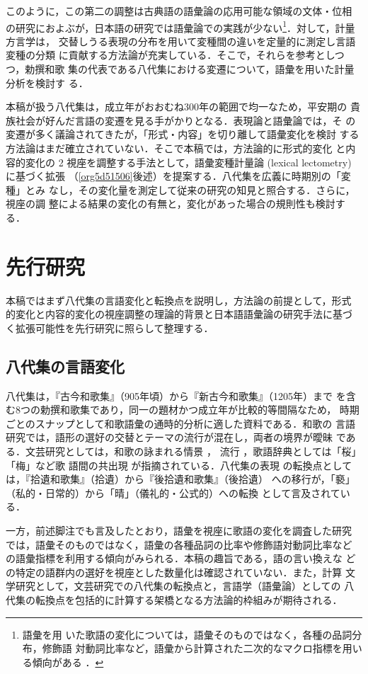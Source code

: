 \documentclass[submit]{ipsj}
\renewcommand{\ref}{\cref}
\begin{document}
このように，この第二の調整は古典語の語彙論の応用可能な領域の文体・位相
の研究におよぶが，日本語の研究では語彙論での実践が少ない\footnote{語彙を用
いた歌語の変化については，語彙そのものではなく，各種の品詞分布，修飾語
対動詞比率など，語彙から計算された二次的なマクロ指標を用いる傾向がある
\cite{nishihata1992Waka,hatano1941Waka}．}．対して，計量方言学は，
交替しうる表現の分布を用いて変種間の違いを定量的に測定し言語変種の分類
に貢献する方法論が充実している．そこで，それらを参考としつつ，勅撰和歌
集の代表である八代集における変遷について，語彙を用いた計量分析を検討す
る．

本稿が扱う八代集は，成立年がおおむね300年の範囲で均一なため，平安期の
貴族社会が好んだ言語の変遷を見る手がかりとなる．表現論と語彙論では，そ
の変遷が多く議論されてきたが，「形式・内容」を切り離して語彙変化を検討
する方法論はまだ確立されていない．そこで本稿では，方法論的に形式的変化
と内容的変化の 2 視座を調整する手法として，語彙変種計量論 (lexical
lectometry) \cite{Speelman2003Profilebased} に基づく拡張
（\ref{org5d51506}後述）を提案する．八代集を広義に時期別の「変種」とみ
なし，その変化量を測定して従来の研究の知見と照合する．さらに，視座の調
整による結果の変化の有無と，変化があった場合の規則性も検討する．
\section{先行研究\label{orgf70a416}}
\label{sec:orge82481f}
本稿ではまず八代集の言語変化と転換点を説明し，方法論の前提として，形式
的変化と内容的変化の視座調整の理論的背景と日本語語彙論の研究手法に基づ
く拡張可能性を先行研究に照らして整理する．
\subsection{八代集の言語変化\label{org031a584}}
\label{sec:org03b9170}
八代集は，『古今和歌集』（905年頃）から『新古今和歌集』（1205年）まで
を含む8つの勅撰和歌集であり，同一の題材かつ成立年が比較的等間隔なため，
時期ごとのスナップとして和歌語彙の通時的分析に適した資料である．和歌の
言語研究では，語形の選好の交替とテーマの流行が混在し，両者の境界が曖昧
である．文芸研究としては，和歌の詠まれる情景 \cite{ueno1976Koshui}，
流行 \cite{kawamura1991Sekkan}，歌語辞典としては「桜」「梅」など歌
語間の共出現 \cite{katagiri1983Uta} が指摘されている．八代集の表現
の転換点としては，『拾遺和歌集』（拾遺）から『後拾遺和歌集』（後拾遺）
への移行が，「褻」（私的・日常的）から「晴」（儀礼的・公式的）への転換
として言及されている\cite{ueno1976Koshui,kawamura1991Sekkan}．

一方，前述脚注でも言及したとおり，語彙を視座に歌語の変化を調査した研究
では，語彙そのものではなく，語彙の各種品詞の比率や修飾語対動詞比率など
の語彙指標を利用する傾向がみられる\cite{tsuji1998Uta,nishihata1992Waka,hatano1941Waka}．本稿の趣旨である，語の言い換えな
どの特定の語群内の選好を視座とした数量化は確認されていない．また，計算
文学研究として，文芸研究での八代集の転換点と，言語学（語彙論）としての
八代集の転換点を包括的に計算する架橋となる方法論的枠組みが期待される．
\end{document}
